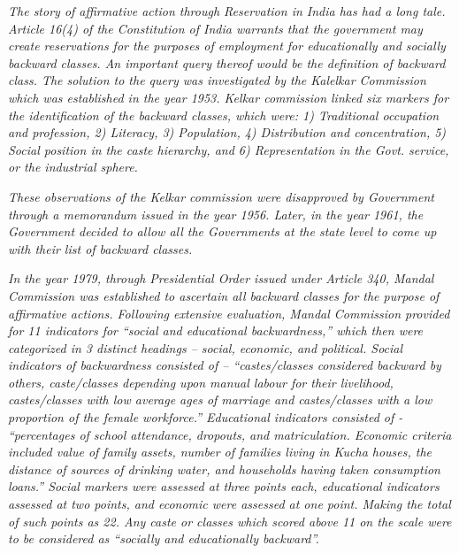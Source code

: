 \begin{multicols}{2}
\vspace{-.2cm}

\noi
\textit{The story of affirmative action through Reservation in India has had a long tale. Article  16(4) of the Constitution of India warrants that the government may create reservations for the purposes of employment for educationally and socially backward classes. An important query thereof would be the definition of backward class. The solution to the query was investigated by the Kalelkar Commission which was established in the year 1953. Kelkar commission linked six markers for the identification of the backward classes, which were: 1) Traditional occupation and profession, 2) Literacy, 3) Population, 4) Distribution and concentration, 5) Social position in the caste hierarchy, and 6) Representation in the Govt. service, or the industrial sphere.}

\vspace{-.1cm}

\noi
\textit{These observations of the Kelkar commission were disapproved by Government through a memorandum issued in the year 1956. Later, in the year 1961, the Government decided to allow all the Governments at the state level to come up with their list of backward classes.}

\vspace{-.1cm}

\noi
\textit{In the year 1979, through Presidential Order issued under Article 340, Mandal Commission was established to ascertain all backward classes for the purpose of affirmative actions. Following extensive evaluation, Mandal Commission provided for 11 indicators for “social and educational backwardness,” which then were categorized in 3 distinct headings – social, economic, and political. Social indicators of backwardness consisted of – “castes/classes considered backward by others, caste/classes depending upon manual labour for their livelihood, castes/classes with low average ages of marriage and castes/classes with a low proportion of the female workforce.” Educational indicators consisted of - “percentages of school attendance, dropouts, and matriculation. Economic criteria included value of family assets, number of families living in Kucha houses, the distance of sources of drinking water, and households having taken consumption loans.” Social markers were assessed at three points each, educational indicators assessed at two points, and economic were assessed at one point. Making the total of such points as 22. Any caste or classes which scored above 11 on the scale were to be considered as “socially and educationally backward”.}


\end{multicols}
